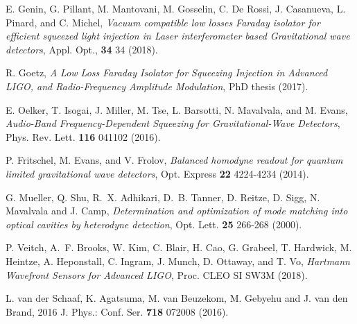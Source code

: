 \begin{thebibliography}{10}
  E. Genin, G. Pillant,  M. Mantovani, M. Gosselin, C. De Rossi, J. Casanueva, L. Pinard, and C. Michel, \emph{Vacuum compatible low losses Faraday isolator for efficient squeezed light injection in Laser interferometer based Gravitational wave detectors}, Appl. Opt., {\bf 34} 34 (2018).
 
  R. Goetz, \emph{A Low Loss Faraday Isolator for Squeezing Injection in Advanced LIGO, and Radio-Frequency Amplitude Modulation}, PhD thesis (2017).

 E. Oelker, T. Isogai, J. Miller, M. Tse, L. Barsotti, N. Mavalvala, and M. Evans, \emph{Audio-Band Frequency-Dependent Squeezing for Gravitational-Wave Detectors}, Phys. Rev. Lett. {\bf 116} 041102 (2016).

 P. Fritschel, M. Evans, and V. Frolov, \emph{Balanced homodyne readout for quantum limited gravitational wave detectors}, Opt. Express {\bf 22} 4224-4234 (2014).

 G. Mueller, Q. Shu, R.~X. Adhikari, D.~B. Tanner, D. Reitze, D. Sigg, N. Mavalvala and J. Camp, \emph{Determination and optimization of mode matching into optical cavities by heterodyne detection}, Opt. Lett. {\bf 25} 266-268 (2000).

 P. Veitch, A.~F. Brooks, W. Kim, C. Blair, H. Cao, G. Grabeel, T. Hardwick, M. Heintze, A. Heponstall, C. Ingram, J. Munch, D. Ottaway, and T. Vo, \emph{Hartmann Wavefront Sensors for Advanced LIGO}, Proc. CLEO SI SW3M (2018).

  L. van der Schaaf, K. Agatsuma, M. van Beuzekom, M. Gebyehu and J. van den Brand, 2016 J. Phys.: Conf. Ser. {\bf 718} 072008 (2016).

\end{thebibliography}
